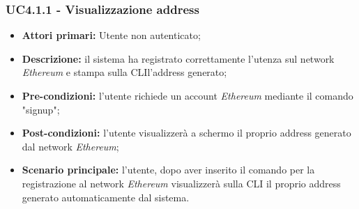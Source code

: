 \subsubsection{UC4.1.1 - Visualizzazione address}
\begin{itemize}
	\item \textbf{Attori primari:} Utente non autenticato;
	\item \textbf{Descrizione:} il sistema ha registrato correttamente l'utenza sul network \textit{Ethereum\glos} e stampa sulla CLI\glo l'address generato; 
	\item \textbf{Pre-condizioni:} l'utente richiede un account \textit{Ethereum\glo} mediante il comando "signup"; 
	\item \textbf{Post-condizioni:} l'utente visualizzerà a schermo il proprio address generato dal network \textit{Ethereum\glos};
	\item \textbf{Scenario principale:} l'utente, dopo aver inserito il comando per la registrazione al network \textit{Ethereum\glo} visualizzerà sulla CLI il proprio address generato automaticamente dal sistema.
\end{itemize}